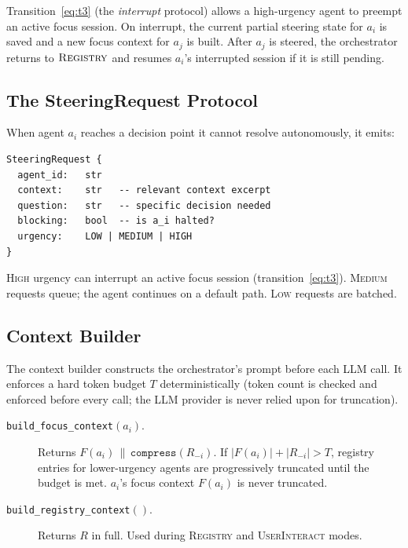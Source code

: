 \documentclass{article}
\begin{document}
Transition~\eqref{eq:t3} (the \emph{interrupt} protocol) allows a
high-urgency agent to preempt an active focus session.
On interrupt, the current partial steering state for $a_i$ is saved and
a new focus context for $a_j$ is built.
After $a_j$ is steered, the orchestrator returns to $\textsc{Registry}$
and resumes $a_i$'s interrupted session if it is still pending.

\subsection{The SteeringRequest Protocol}
\label{sec:protocol}

When agent $a_i$ reaches a decision point it cannot resolve autonomously,
it emits:

\begin{verbatim}
SteeringRequest {
  agent_id:   str
  context:    str   -- relevant context excerpt
  question:   str   -- specific decision needed
  blocking:   bool  -- is a_i halted?
  urgency:    LOW | MEDIUM | HIGH
}
\end{verbatim}

\textsc{High} urgency can interrupt an active focus session
(transition~\eqref{eq:t3}).
\textsc{Medium} requests queue; the agent continues on a default path.
\textsc{Low} requests are batched.

\subsection{Context Builder}
\label{sec:context_builder}

The context builder constructs the orchestrator's prompt before each LLM
call.
It enforces a hard token budget $T$ deterministically (token count is
checked and enforced before every call; the LLM provider is never relied
upon for truncation).

\begin{description}
  \item[\texttt{build\_focus\_context}$(a_i)$.]
  Returns $F(a_i) \,\|\, \texttt{compress}(R_{-i})$.
  If $|F(a_i)| + |R_{-i}| > T$, registry entries for lower-urgency
  agents are progressively truncated until the budget is met.
  $a_i$'s focus context $F(a_i)$ is never truncated.

  \item[\texttt{build\_registry\_context}$()$.]
  Returns $R$ in full.
  Used during \textsc{Registry} and \textsc{UserInteract} modes.
\end{description}
\end{document}
